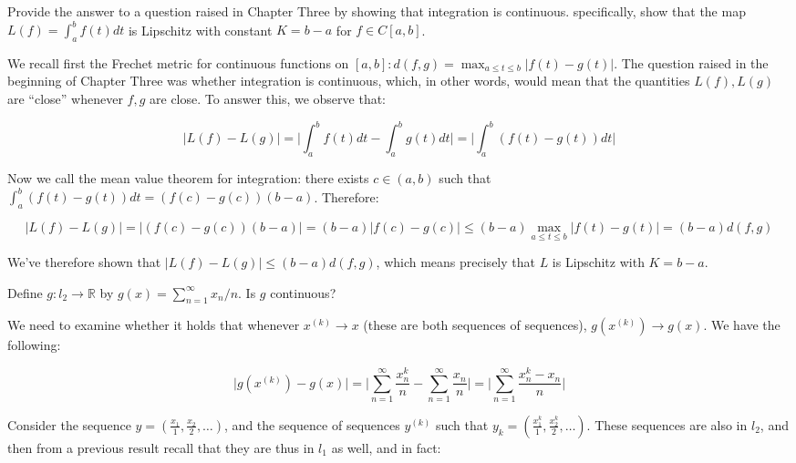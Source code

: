\begin{exercise}{26}
    Provide the answer to a question raised in Chapter Three by showing that integration is continuous.
    specifically, show that the map $L(f) = \int_{a}^{b} f(t) dt$ is Lipschitz with constant $K = b - a$ for $f \in C[a, b]$.
\end{exercise}

\begin{solution}
    
    We recall first the Frechet metric for continuous functions on $[a, b]: d(f, g) = \max_{a \leq t \leq b} \lvert f(t) - g(t) \rvert$.
    The question raised in the beginning of Chapter Three was whether integration is continuous, which, in other words, would mean that the quantities $L(f), L(g)$ are ``close'' whenever $f, g$ are close.
    To answer this, we observe that:

    \[\lvert L(f) - L(g) \rvert = \Biggl\lvert \int_{a}^{b} f(t) dt - \int_{a}^{b} g(t) dt \Biggr\rvert = \Biggl\lvert \int_{a}^{b} (f(t) - g(t)) dt \Biggr\rvert\]

    Now we call the mean value theorem for integration: there exists $c \in (a, b)$ such that $\int_{a}^{b}(f(t) - g(t))dt = (f(c) - g(c))(b - a)$.
    Therefore:

    \[\lvert L(f) - L(g) \rvert = \lvert (f(c) - g(c))(b - a) \rvert = (b - a) \lvert f(c) - g(c) \rvert \leq (b - a) \max_{a \leq t \leq b} \lvert f(t) - g(t) \rvert = (b - a)d(f, g)\]
    
    We've therefore shown that $\lvert L(f) - L(g) \rvert \leq (b - a)d(f, g)$, which means precisely that $L$ is Lipschitz with $K = b - a$.
\end{solution}

\begin{exercise}{28}
    Define $g: l_2 \rightarrow \mathbb{R}$ by $g(x) = \sum_{n=1}^{\infty} x_n/n$.
    Is $g$ continuous?
\end{exercise}

\begin{solution}
    
    We need to examine whether it holds that whenever $x^{(k)} \rightarrow x$ (these are both sequences of sequences), $g(x^{(k)}) \rightarrow g(x)$.
    We have the following:

    \[ \lvert g(x^{(k)}) - g(x) \rvert = \lvert \sum_{n=1}^{\infty} \frac{x_n^k}{n} - \sum_{n=1}^{\infty} \frac{x_n}{n} \rvert = \lvert \sum_{n=1}^{\infty} \frac{x_n^k - x_n}{n} \rvert \]

    Consider the sequence $y = (\frac{x_1}{1}, \frac{x_2}{2}, \ldots)$, and the sequence of sequences $y^{(k)}$ such that $y_k = (\frac{x_1^k}{1}, \frac{x_2^k}{2}, \ldots)$.
    These sequences are also in $l_2$, and then from a previous result recall that they are thus in $l_1$ as well, and in fact:


\end{solution}

